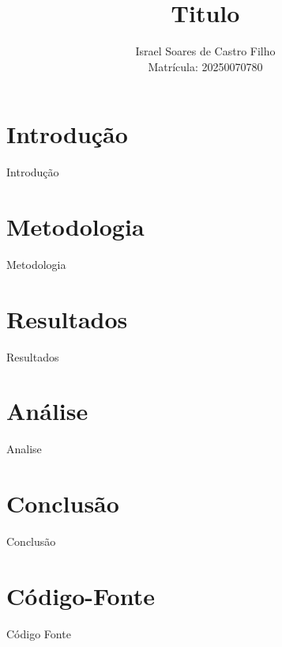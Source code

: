 \documentclass[a4paper,12pt]{article}
\title{Titulo}
\author{Israel Soares de Castro Filho \\ Matrícula: 20250070780}
\date{}
\begin{document}
\maketitle

\section{Introdução}

Introdução

\section{Metodologia}

Metodologia

\section{Resultados}

Resultados

\section{Análise}

Analise

\section{Conclusão}

Conclusão

\newpage
\appendix

\section{Código-Fonte}

Código Fonte
\end{document}
